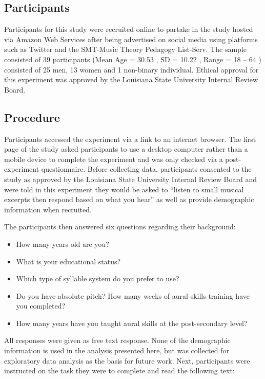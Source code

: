 \documentclass[english,man,floatsintext]{apa6}
\providecommand{\tightlist}{%
  \setlength{\itemsep}{0pt}\setlength{\parskip}{0pt}}
\begin{document}
\hypertarget{participants}{%
\subsection{Participants}\label{participants}}

Participants for this study were recruited online to partake in the study hosted via Amazon Web Services after being advertised on social media using platforms such as Twitter and the SMT-Music Theory Pedagogy List-Serv.
The sample consisted of 39 participants (Mean Age = 30.53 , SD = 10.22 , Range = 18 -- 64 ) consisted of 25 men, 13 women and 1 non-binary individual.
Ethical approval for this experiment was approved by the Louisiana State University Internal Review Board.

\hypertarget{procedure}{%
\subsection{Procedure}\label{procedure}}

Participants accessed the experiment via a link to an internet browser.
The first page of the study asked participants to use a desktop computer rather than a mobile device to complete the experiment and was only checked via a post-experiment questionnaire.
Before collecting data, participants consented to the study as approved by the Louisiana State University Internal Review Board and were told in this experiment they would be asked to \enquote{listen to small musical excerpts then respond based on what you hear} as well as provide demographic information when recruited.

The participants then answered six questions regarding their background:

\begin{itemize}
\tightlist
\item
  How many years old are you?
\item
  What is your educational status?
\item
  Which type of syllable system do you prefer to use?
\item
  Do you have absolute pitch? How many weeks of aural skills training have you completed?
\item
  How many years have you taught aural skills at the post-secondary level?
\end{itemize}

All responses were given as free text response.
None of the demographic information is used in the analysis presented here, but was collected for exploratory data analysis as the basis for future work.
Next, participants were instructed on the task they were to complete and read the following text:
\end{document}
